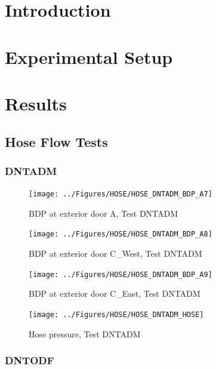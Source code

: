 \documentclass[11pt,oneside]{book}
\begin{document}
\mainmatter

\chapter{Introduction}
\label{chap:Introduction}

\chapter{Experimental Setup}
\label{chap:Experimental_Setup}

\chapter{Results}
\label{chap:Results}

\section{Hose Flow Tests}

\subsection{DNTADM}

\begin{figure}[!ht]
\texttt{[image: ../Figures/HOSE/HOSE\_DNTADM\_BDP\_A7]}
\caption{BDP at exterior door A, Test DNTADM}
\label{fig:HOSE_DNTADM_BDP_A7}
\end{figure}

\begin{figure}[!ht]
\texttt{[image: ../Figures/HOSE/HOSE\_DNTADM\_BDP\_A8]}
\caption{BDP at exterior door C\_West, Test DNTADM}
\label{fig:HOSE_DNTADM_BDP_A8}
\end{figure}

\begin{figure}[!ht]
\texttt{[image: ../Figures/HOSE/HOSE\_DNTADM\_BDP\_A9]}
\caption{BDP at exterior door C\_East, Test DNTADM}
\label{fig:HOSE_DNTADM_BDP_A9}
\end{figure}

\begin{figure}[!ht]
\texttt{[image: ../Figures/HOSE/HOSE\_DNTADM\_HOSE]}
\caption{Hose pressure, Test DNTADM}
\label{fig:HOSE_DNTADM_HOSE}
\end{figure}


\clearpage


\subsection{DNTODF}
\end{document}

